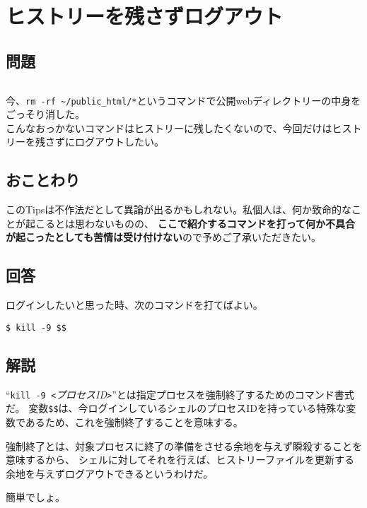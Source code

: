 \section{ヒストリーを残さずログアウト}

\subsection*{問題}
\noindent
$\!\!\!\!\!$
\begin{grshfboxit}{160.0mm}
	今、\verb|rm -rf ~/public_html/*|というコマンドで公開webディレクトリーの中身をごっそり消した。 \\
	こんなおっかないコマンドはヒストリーに残したくないので、今回だけはヒストリーを残さずにログアウトしたい。
\end{grshfboxit}

\subsection*{おことわり}

このTipsは不作法だとして異論が出るかもしれない。私個人は、何か致命的なことが起こるとは思わないものの、
\textbf{ここで紹介するコマンドを打って何か不具合が起こったとしても苦情は受け付けない}ので予めご了承いただきたい。

\subsection*{回答}

ログインしたいと思った時、次のコマンドを打てばよい。

\begin{screen}
	\verb|$ kill -9 $$| \return
\end{screen}

\subsection*{解説}

``\verb|kill -9 <|\textit{プロセスID}\verb|>|''とは指定プロセスを強制終了するためのコマンド書式だ。
変数\verb|$$|は、今ログインしているシェルのプロセスIDを持っている特殊な変数であるため、これを強制終了することを意味する。

強制終了とは、対象プロセスに終了の準備をさせる余地を与えず瞬殺することを意味するから、
シェルに対してそれを行えば、ヒストリーファイルを更新する余地を与えずログアウトできるというわけだ。

簡単でしょ。
